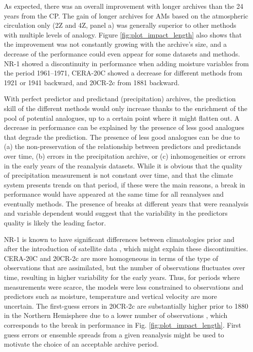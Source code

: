 \documentclass{ametsoc}
\begin{document}
As expected, there was an overall improvement with longer archives than the 24 years from the CP. The gain of longer archives for AMs based on the atmospheric circulation only (2Z and 4Z, panel a) was generally superior to other methods with multiple levels of analogy. Figure \ref{fig:plot_impact_length} also shows that the improvement was not constantly growing with the archive's size, and a decrease of the performance could even appear for some datasets and methods. NR-1 showed a discontinuity in performance when adding moisture variables from the period 1961--1971, CERA-20C showed a decrease for different methods from 1921 or 1941 backward, and 20CR-2c from 1881 backward.

With perfect predictor and predictand (precipitation) archives, the prediction skill of the different methods would only increase thanks to the enrichment of the pool of potential analogues, up to a certain point where it might flatten out. A decrease in performance can be explained by the presence of less good analogues that degrade the prediction. The presence of less good analogues can be due to (a) the non-preservation of the relationship between predictors and predictands over time, (b) errors in the precipitation archive, or (c) inhomogeneities or errors in the early years of the reanalysis datasets. While it is obvious that the quality of precipitation measurement is not constant over time, and that the climate system presents trends on that period, if these were the main reasons, a break in performance would have appeared at the same time for all reanalyses and eventually methods. The presence of breaks at different years that were reanalysis and variable dependent would suggest that the variability in the predictors quality is likely the leading factor.

NR-1 is known to have significant differences between climatologies prior and after the introduction of satellite data \citep{Kistler2001}, which might explain these discontinuities. CERA-20C and 20CR-2c are more homogeneous in terms of the type of observations that are assimilated, but the number of observations fluctuates over time, resulting in higher variability for the early years. Thus, for periods where measurements were scarce, the models were less constrained to observations and predictors such as moisture, temperature and vertical velocity are more uncertain. The first-guess errors in 20CR-2c are substantially higher prior to 1880 in the Northern Hemisphere due to a lower number of observations \citep{Compo2011}, which corresponds to the break in performance in Fig. \ref{fig:plot_impact_length}. First guess errors or ensemble spreads from a given reanalysis might be used to motivate the choice of an acceptable archive period.
\end{document}
